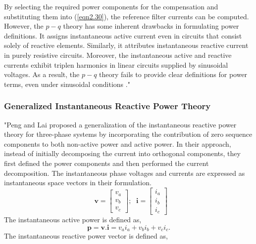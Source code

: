By selecting the required power components for the compensation and substituting them into (\ref{eqn2.30}), the reference filter currents can be computed. However, the $p-q$ theory has some inherent  drawbacks in formulating power definitions. It assigns instantaneous active current even in circuits that consist solely of reactive elements. Similarly, it attributes instantaneous reactive current in purely resistive circuits. Moreover, the instantaneous active and reactive currents exhibit triplen harmonics in linear circuits supplied by sinusoidal voltages. As a result, the $p-q$ theory fails to provide clear definitions for power terms, even under sinusoidal conditions \cite{czarnecki2004some}."
 \vspace*{-1.5cm}
\subsubsection{Generalized Instantaneous Reactive Power Theory \cite{peng1996generalized,SrinivasBhaskar}}
\vspace*{-0.5cm}
"Peng and Lai proposed a generalization of the instantaneous reactive power theory for three-phase systems by incorporating the contribution of zero sequence components to both non-active power and active power. In their approach, instead of initially decomposing the current into orthogonal components, they first defined the power components and then performed the current decomposition. The instantaneous phase voltages and currents are expressed as instantaneous space vectors in their formulation.
 \begin{equation}
\textbf{ {v}} = \begin{bmatrix} v_a \\ v_b \\ v_c \end{bmatrix}; \;  \textbf {{ i}} = \begin{bmatrix} i_a \\ i_b \\ i_c \end{bmatrix}
\label{eqn2.31}
\end{equation}
The instantaneous active power is defined as,  \vspace*{-.5cm}
 \begin{equation}
\textbf {{p}} =\textbf {{v}}. \textbf{{i}} = v_a i_a + v_b i_b + v_c i_c.
\label{eqn2.32}
\end{equation} \vspace*{-.5cm}
The instantaneous reactive power vector is defined as, 
